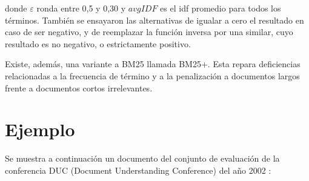\documentclass{llncs}
\begin{document}
donde $\varepsilon$ ronda entre 0,5 y 0,30 y $avgIDF$ es el idf promedio para todos los términos.
También se ensayaron las alternativas de igualar a cero el resultado en caso de ser negativo, y de reemplazar la función inversa por una similar, cuyo resultado es no negativo, o estrictamente positivo. 

Existe, además, una variante a BM25 llamada BM25+. Esta repara deficiencias relacionadas a la frecuencia de término y a la penalización a documentos largos frente a documentos cortos irrelevantes.


\section{Ejemplo}
Se muestra a continuación un documento del conjunto de evaluación de la conferencia DUC (Document Understanding Conference) del año 2002 \cite{duc2002-guidelines}:
\end{document}
